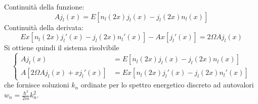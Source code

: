 \documentclass[a4paper]{article}
\begin{document}
        Continuità della funzione:
        \begin{equation*}
            Aj_l(x)=E\left[n_l(2x)j_l(x)-j_l(2x)n_l(x)\right]
        \end{equation*}
        Continuità della derivata:
        \begin{equation*}
            Ex\left[n_l(2x)j_l'(x)-j_l(2x)n_l'(x)\right]-Ax\left[j_l'(x)\right]=2\Omega Aj_l(x)
        \end{equation*}
        Si ottiene quindi il sistema risolvibile
        \begin{equation*}
            \begin{cases}
                Aj_l(x)&=E\left[n_l(2x)j_l(x)-j_l(2x)n_l(x)\right]\\
                A\left[2\Omega Aj_l(x)+xj_l'(x)\right]&=Ex\left[n_l(2x)j_l'(x)-j_l(2x)n_l'(x)\right]
            \end{cases}
        \end{equation*}
        che fornisce soluzioni $k_n$ ordinate per lo spettro energetico discreto ad autovalori $w_n=\frac{\hbar^2}{2m}k_n^2$.



    
\end{document}
